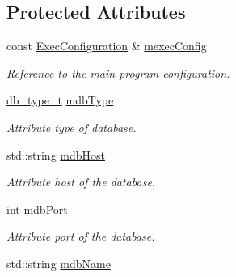 \subsection*{Protected Attributes}
\begin{DoxyCompactItemize}
\item 
\hypertarget{classDbConfiguration_aec42c79cc0d155ffc54ddfa8ee9daecd}{
const \hyperlink{classExecConfiguration}{ExecConfiguration} \& \hyperlink{classDbConfiguration_aec42c79cc0d155ffc54ddfa8ee9daecd}{mexecConfig}}
\label{classDbConfiguration_aec42c79cc0d155ffc54ddfa8ee9daecd}

\begin{DoxyCompactList}\small\item\em Reference to the main program configuration. \item\end{DoxyCompactList}\item 
\hypertarget{classDbConfiguration_a702c7cf89e77b3fd6ececcd51734c5b6}{
\hyperlink{classDbConfiguration_a4a57e43a5017a5c4833a784a994c91cf}{db\_\-type\_\-t} \hyperlink{classDbConfiguration_a702c7cf89e77b3fd6ececcd51734c5b6}{mdbType}}
\label{classDbConfiguration_a702c7cf89e77b3fd6ececcd51734c5b6}

\begin{DoxyCompactList}\small\item\em Attribute type of database. \item\end{DoxyCompactList}\item 
\hypertarget{classDbConfiguration_a99de17b15f3b8fa9e7ed76f564cbeaf0}{
std::string \hyperlink{classDbConfiguration_a99de17b15f3b8fa9e7ed76f564cbeaf0}{mdbHost}}
\label{classDbConfiguration_a99de17b15f3b8fa9e7ed76f564cbeaf0}

\begin{DoxyCompactList}\small\item\em Attribute host of the database. \item\end{DoxyCompactList}\item 
\hypertarget{classDbConfiguration_a25508bbd318ad0a595dfcb05bb1a6a28}{
int \hyperlink{classDbConfiguration_a25508bbd318ad0a595dfcb05bb1a6a28}{mdbPort}}
\label{classDbConfiguration_a25508bbd318ad0a595dfcb05bb1a6a28}

\begin{DoxyCompactList}\small\item\em Attribute port of the database. \item\end{DoxyCompactList}\item 
\hypertarget{classDbConfiguration_aeb3141eddb0bdb0081dee5e23ae9a29a}{
std::string \hyperlink{classDbConfiguration_aeb3141eddb0bdb0081dee5e23ae9a29a}{mdbName}}
\label{classDbConfiguration_aeb3141eddb0bdb0081dee5e23ae9a29a}


\end{DoxyCompactItemize}
